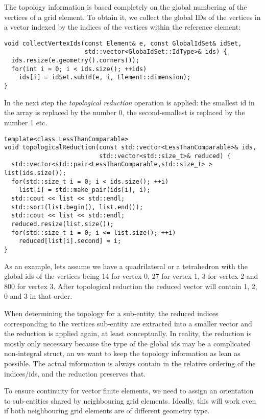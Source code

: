 \documentclass[a4paper,11pt]{article}
\begin{document}
The topology information is based completely on the global numbering of the
vertices of a grid element.  To obtain it, we collect the global IDs of the
vertices in a vector indexed by the indices of the vertices within the
reference element:
\begin{lstlisting}
void collectVertexIds(const Element& e, const GlobalIdSet& idSet,
                      std::vector<GlobaIdSet::IdType>& ids) {
  ids.resize(e.geometry().corners());
  for(int i = 0; i < ids.size(); ++ids)
    ids[i] = idSet.subId(e, i, Element::dimension);
}
\end{lstlisting}
In the next step the {\em topological reduction} operation is applied: the
smallest id in the array is replaced by the number 0, the second-smallest is
replaced by the number 1 etc.
\begin{lstlisting}
template<class LessThanComparable>
void topologicalReduction(const std::vector<LessThanComparable>& ids,
                          std::vector<std::size_t>& reduced) {
  std::vector<std::pair<LessThanComparable,std::size_t> > list(ids.size());
  for(std::size_t i = 0; i < ids.size(); ++i)
    list[i] = std::make_pair(ids[i], i);
  std::cout << list << std::endl;
  std::sort(list.begin(), list.end());
  std::cout << list << std::endl;
  reduced.resize(list.size());
  for(std::size_t i = 0; i <= list.size(); ++i)
    reduced[list[i].second] = i;
}
\end{lstlisting}
As an example, lets assume we have a quadrilateral or a tetrahedron with the
global ids of the vertices being 14 for vertex 0, 27 for vertex 1, 3 for
vertex 2 and 800 for vertex 3.  After topological reduction the reduced vector
will contain 1, 2, 0 and 3 in that order.

When determining the topology for a sub-entity, the reduced indices
corresponding to the vertices sub-entity are extracted into a smaller vector
and the reduction is applied again, at least conceptually.  In reality, the
reduction is mostly only necessary because the type of the global ids may be a
complicated non-integral struct, an we want to keep the topology information
as lean as possible.  The actual information is always contain in the relative
ordering of the indices/ids, and the reduction preserves that.

To ensure continuity for vector finite elements, we need to assign an
orientation to sub-entities shared by neighbouring grid elements.  Ideally,
this will work even if both neighbouring grid elements are of different
geometry type.
\end{document}
